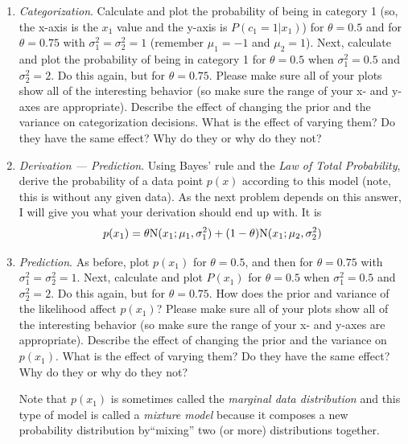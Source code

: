 \documentclass[11pt]{article}
\begin{document}
\begin{enumerate}
\begin{enumerate}
\item {\em Categorization}. Calculate and plot the probability of being in category 1 (so, the x-axis is the $x_1$ value and the y-axis is $P(c_1=1|x_1)$) for $\theta = 0.5$ and for $\theta = 0.75$ with $\sigma_1^2=\sigma_2^2=1$ (remember $\mu_1 = -1$ and $\mu_2=1$). Next, calculate and plot the probability of being in category 1 for $\theta = 0.5$ when $\sigma_1^2=0.5$ and $\sigma_2^2=2$. Do this again, but for $\theta=0.75$. Please make sure all of your plots show all of the interesting behavior (so make sure the range of your x- and y-axes are appropriate). Describe the effect of changing the prior and the variance on categorization decisions. What is the effect of varying them? Do they have the same effect? Why do they or why do they not? 

\item {\em Derivation --- Prediction}. Using Bayes' rule and the {\em Law of Total Probability}, derive the probability of a data point $p(x)$ according to this model (note, this is without any given data). As the next problem depends on this answer, I will give you what your derivation should end up with. It is
\begin{equation*}
p(x_1) = \theta {\rm N}(x_1; \mu_1, \sigma_1^2) + (1-\theta){\rm N}(x_1; \mu_2, \sigma_2^2)
\end{equation*}

\item {\em Prediction}. As before, plot $p(x_1)$ for $\theta = 0.5$, and then for $\theta =  0.75$ with $\sigma_1^2=\sigma_2^2=1$. Next, calculate and plot $P(x_1)$ for $\theta = 0.5$ when $\sigma_1^2=0.5$ and $\sigma_2^2=2$. Do this again, but for $\theta=0.75$. How does the prior and variance of the likelihood affect $p(x_1)$?  Please make sure all of your plots show all of the interesting behavior (so make sure the range of your x- and y-axes are appropriate). Describe the effect of changing the prior and the variance on $p(x_1)$. What is the effect of varying them? Do they have the same effect? Why do they or why do they not? 

Note that $p(x_1)$ is sometimes called the {\em marginal data distribution} and this type of model is called a {\em mixture model} because it composes a new probability distribution by``mixing'' two (or more) distributions together.

\end{enumerate}
\end{enumerate}
\end{document}
